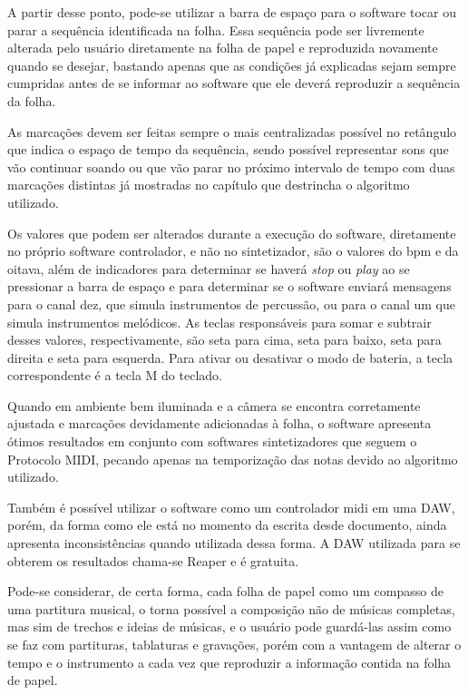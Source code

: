 \documentclass[12pt]{report}
\begin{document}
A partir desse ponto, pode-se utilizar a barra de espaço para o
software tocar ou parar a sequência identificada na folha. Essa
sequência pode ser livremente alterada pelo usuário diretamente na
folha de papel e reproduzida novamente quando se desejar, bastando
apenas que as condições já explicadas sejam sempre cumpridas antes de
se informar ao software que ele deverá reproduzir a sequência da
folha.

As marcações devem ser feitas sempre o mais centralizadas possível no
retângulo que indica o espaço de tempo da sequência, sendo possível
representar sons que vão continuar soando ou que vão parar no próximo
intervalo de tempo com duas marcações distintas já mostradas no
capítulo que destrincha o algoritmo utilizado.

Os valores que podem ser alterados durante a execução do software,
diretamente no próprio software controlador, e não no sintetizador,
são o valores do bpm e da oitava, além de indicadores para determinar
se haverá {\it stop} ou {\it play} ao se pressionar a barra de espaço
e para determinar se o software enviará mensagens para o canal dez,
que simula instrumentos de percussão, ou para o canal um que simula
instrumentos melódicos. As teclas responsáveis para somar e subtrair
desses valores, respectivamente, são seta para cima, seta para baixo,
seta para direita e seta para esquerda. Para ativar ou desativar o
modo de bateria, a tecla correspondente é a tecla M do teclado.

Quando em ambiente bem iluminada e a câmera se encontra corretamente
ajustada e marcações devidamente adicionadas à folha, o software
apresenta ótimos resultados em conjunto com softwares sintetizadores
que seguem o Protocolo MIDI, pecando apenas na temporização das notas
devido ao algoritmo utilizado.

Também é possível utilizar o software como um controlador midi em uma
DAW, porém, da forma como ele está no momento da escrita desde
documento, ainda apresenta inconsistências quando utilizada dessa
forma. A DAW utilizada para se obterem os resultados chama-se Reaper e
é gratuita.

Pode-se considerar, de certa forma, cada folha de papel como um
compasso de uma partitura musical, o torna possível a composição não
de músicas completas, mas sim de trechos e ideias de músicas, e o
usuário pode guardá-las assim como se faz com partituras, tablaturas e
gravações, porém com a vantagem de alterar o tempo e o instrumento a
cada vez que reproduzir a informação contida na folha de papel.
\end{document}
